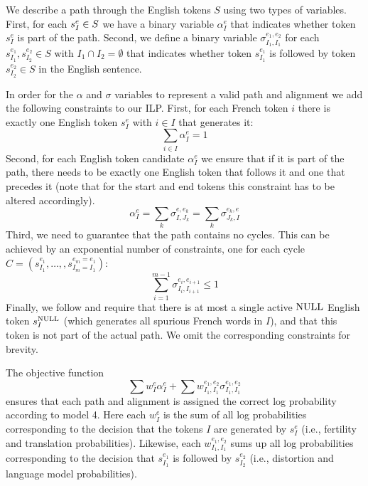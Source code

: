 We describe a path through the English tokens $S$ using two types
of variables. First, for each $s_{I}^{e}\in S$ we have a
binary variable $\alpha_{I}^{e}$ that indicates whether token $s_{I}^{e}$
is part of the path. Second, we define a binary variable $\sigma_{I_{1},I_{1}}^{e_{1},e_{2}}$
for each $s_{I_{1}}^{e_{1}},s_{I_{2}}^{e_{2}}\in S$ with $I_{1}\cap I_{2}=\emptyset$
that indicates whether token $s_{I_{1}}^{e_{1}}$ is followed by token
$s_{I_{2}}^{e_{2}}\in S$ in the English sentence.

In order for the $\alpha$ and $\sigma$ variables to represent a
valid path and alignment we add the following constraints to our ILP.
First, for each French token $i$ there is exactly one English token
$s_{I}^{e}$ with $i\in I$ that generates it: \[
\sum_{i\in I}\alpha_{I}^{e}=1\]
Second, for each English token candidate $\alpha_{I}^{e}$ we ensure
that if it is part of the path, there needs to be exactly one English
token that follows it and one that precedes it (note that for the
start and end tokens this constraint has to be altered accordingly).\[
\alpha_{I}^{e}=\sum_{k}\sigma_{I,J_{k}}^{e,e_{k}}=\sum_{k}\sigma_{J_{k},I}^{e_{k},e}\]
Third, we need to guarantee that the path contains no cycles. This
can be achieved by an exponential number of constraints, one for each
cycle $C=\left(s_{I_{1}}^{e_{1}},\ldots,,s_{I_{m}=I_{1}}^{e_{m}=e_{1}}\right)$:
\[
\sum_{i=1}^{m-1}\sigma_{I_{i},I_{i+1}}^{e_{i},e_{i+1}}\leq1\]
Finally, we follow \citet{germann01fast} and require that there is
at most a single active $\text{NULL}$ English token $s_{I}^{\text{NULL}}$ (which
generates all spurious French words in $I$), and that this token
is not part of the actual path. We omit the corresponding constraints
for brevity.

The objective function\[
\sum w_{I}^{e}\alpha_{I}^{e}+\sum w_{I_{1},I_{1}}^{e_{1},e_{2}}\sigma_{I_{1},I_{1}}^{e_{1},e_{2}}\]
ensures that each path and alignment is assigned the correct log probability
according to model 4. Here each $w_{I}^{e}$ is the sum of all log
probabilities corresponding to the decision that the tokens $I$ are
generated by $s_{I}^{e}$ (i.e., fertility and translation probabilities).
Likewise, each $w_{I_{1},I_{1}}^{e_{1},e_{2}}$ sums up all log probabilities
corresponding to the decision that $s_{I_{1}}^{e_{1}}$ is followed
by $s_{I_{2}}^{e_{2}}$ (i.e., distortion and language model probabilities).


